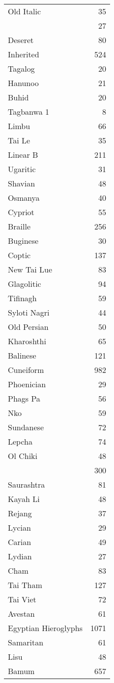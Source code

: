 \begin{longtable}{lr}
Old Italic	&35\\
\nameref{s:gothic}	 &27\\
Deseret	&80\\
Inherited	&524\\
Tagalog	&20\\
Hanunoo	&21\\
Buhid	&20\\
Tagbanwa	1&8\\
Limbu	&66\\
Tai Le	 &35\\
Linear B	&211\\
Ugaritic	&31\\
Shavian	&48\\
Osmanya	&40\\
Cypriot	&55\\
Braille	&256\\
Buginese	&30\\
Coptic	 &137\\
New Tai Lue	&83\\
Glagolitic	&94\\
Tifinagh	&59\\
Syloti Nagri	&44\\
Old Persian	&50\\
Kharoshthi	&65\\
Balinese	&121\\
Cuneiform	&982\\
Phoenician	&29\\
Phags Pa	&56\\
Nko	 &59\\
Sundanese	&72\\
Lepcha	 &74\\
Ol Chiki	&48\\
\nameref{s:vai}	&300\\
Saurashtra	&81\\
Kayah Li	&48\\
Rejang	 &37\\
Lycian	 &29\\
Carian	 &49\\
Lydian	 &27\\
Cham	 &83\\
Tai Tham	&127\\
Tai Viet	&72\\
Avestan	&61\\
Egyptian Hieroglyphs	&1071\\
Samaritan	 &61\\
Lisu	&48\\
Bamum	&657\\

\end{longtable}
